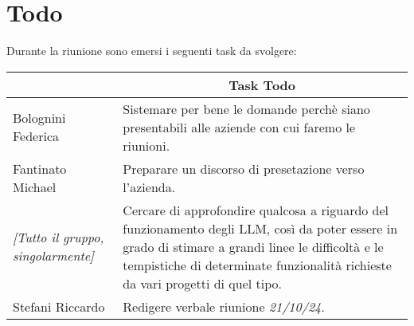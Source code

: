 \section{Todo}

Durante la riunione sono emersi i seguenti task da svolgere:

\vspace{0.5cm}

\begin{table}[htbp]
\begin{tabular}{|p{}|p{}|}
    \hline
    \rowcolor[gray]{0.9}
    \multicolumn{1}{|c|}{\textbf{Assegnatario}} & \multicolumn{1}{|c|}{\textbf{Task Todo}} \\
    \hline
    Bolognini Federica & Sistemare per bene le domande perchè siano presentabili alle aziende con cui faremo le riunioni. \\
    \hline
    Fantinato Michael & Preparare un discorso di presetazione verso l'azienda. \\
    \hline
    \emph{[Tutto il gruppo, singolarmente]} & Cercare di approfondire qualcosa a riguardo del funzionamento degli LLM, così da poter essere in grado di stimare a grandi linee le difficoltà e le tempistiche di determinate funzionalità richieste da vari progetti di quel tipo. \\
    \hline
    Stefani Riccardo & Redigere verbale riunione \emph{21/10/24}. \\
    \hline
\end{tabular}
\end{table}
